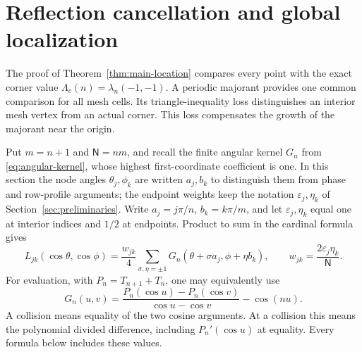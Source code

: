 \section{Reflection cancellation and global localization}
\label{sec:argmax}

The proof of Theorem~\ref{thm:main-location} compares every point with
the exact corner value $\Lambda_c(n)=\lambda_n(-1,-1)$.  A periodic
majorant provides one common comparison for all mesh cells.  Its
triangle-inequality loss distinguishes an interior mesh vertex from an
actual corner.  This loss compensates the growth of the majorant near the origin.

Put $m=n+1$ and $\mathsf N=nm$, and recall the finite angular kernel
$G_n$ from \eqref{eq:angular-kernel}, whose highest first-coordinate
coefficient is one. In this section the node angles
$\theta_j,\phi_k$ are written $a_j,b_k$ to distinguish them from
phase and row-profile arguments; the endpoint weights keep the
notation $\varepsilon_j,\eta_k$ of Section~\ref{sec:preliminaries}. Write
$a_j=j\pi/n$, $b_k=k\pi/m$, and let $\varepsilon_j,\eta_k$ equal one at interior
indices and $1/2$ at endpoints.  Product to sum in the cardinal formula gives
\begin{equation}\label{ul:cardinal-reflection}
 L_{jk}(\cos\theta,\cos\phi)=\frac{w_{jk}}4
   \sum_{\sigma,\eta=\pm1}G_n(\theta+\sigma a_j,\phi+\eta b_k),
 \qquad w_{jk}=\frac{2\varepsilon_j\eta_k}{\mathsf N}.
\end{equation}
For evaluation, with $P_n=T_{n+1}+T_n$, one may equivalently use
\begin{equation}\label{eq:kernel-evaluation}
 G_n(u,v)=\frac{P_n(\cos u)-P_n(\cos v)}{\cos u-\cos v}-\cos(nu).
\end{equation}
A collision means equality of the two cosine arguments. At a collision this means the polynomial divided difference, including
$P_n'(\cos u)$ at equality.  Every formula below includes these values.

